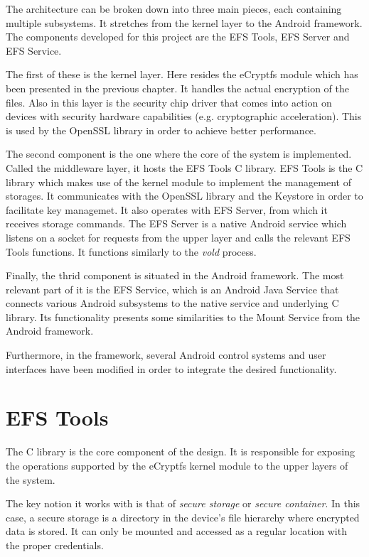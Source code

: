 The architecture can be broken down into three main pieces, each containing multiple subsystems. It stretches from the kernel layer to the Android framework. The components developed for this project are the EFS Tools, EFS Server and EFS Service.

The first of these is the kernel layer. Here resides the eCryptfs module which has been presented in the previous chapter. It handles the actual encryption of the files. Also in this layer is the security chip driver that comes into action on devices with security hardware capabilities (e.g. cryptographic acceleration). This is used by the OpenSSL library in order to achieve better performance.

The second component is the one where the core of the system is implemented. Called the middleware layer, it hosts the EFS Tools C library. EFS Tools is the C library which makes use of the kernel module to implement the management of storages. It communicates with the OpenSSL library and the Keystore in order to facilitate key managemet. It also operates with EFS Server, from which it receives storage commands. The EFS Server is a native Android service which listens on a socket for requests from the upper layer and calls the relevant EFS Tools functions. It functions similarly to the \textit{vold} process.

Finally, the thrid component is situated in the Android framework. The most relevant part of it is the EFS Service, which is an Android Java Service that connects various Android subsystems to the native service and underlying C library. Its functionality presents some similarities to the Mount Service from the Android framework.

Furthermore, in the framework, several Android control systems and user interfaces have been modified in order to integrate the desired functionality.

\section{EFS Tools}
\label{sec:c-multi-user}

The C library is the core component of the design. It is responsible for exposing the operations supported by the eCryptfs kernel module to the upper layers of the system.

The key notion it works with is that of \textit{secure storage} or \textit{secure container}. In this case, a secure storage is a directory in the device's file hierarchy where encrypted data is stored. It can only be mounted and accessed as a regular location with the proper credentials.

